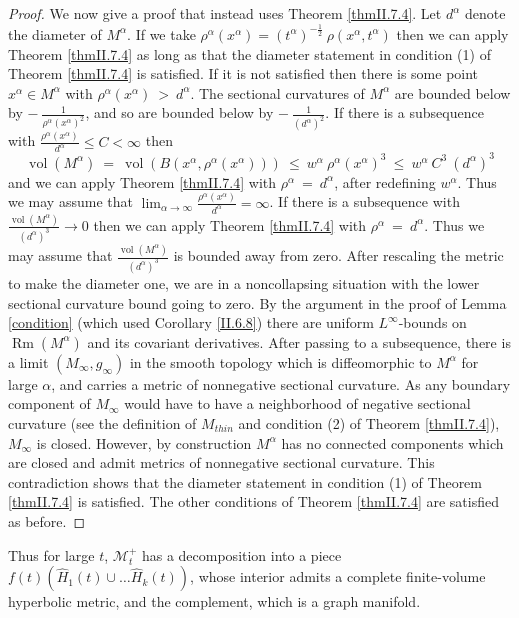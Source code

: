 \documentclass[12pt]{amsart}
\newcommand{\al}{\alpha}
\newcommand{\M}{{\mathcal M}}
\newcommand{\Rm}{\operatorname{Rm}}
\newcommand{\vol}{\operatorname{vol}}
\numberwithin{equation}{section}
\theoremstyle{plain}
\theoremstyle{definition}
\theoremstyle{remark}
\begin{document}
\begin{proof}
We now give a proof that instead uses Theorem \ref{thmII.7.4}.
Let $d^\al$ denote the diameter of $M^\al$.
If we take $\rho^\al(x^\al) = (t^\al)^{- \frac12} \: \rho(x^\al, t^\al)$
then we can apply Theorem \ref{thmII.7.4} as long as
that the diameter statement in condition (1) of Theorem \ref{thmII.7.4} is
satisfied. 
If it is not satisfied then there is some point $x^\al \in M^\al$ with
$\rho^\al(x^\al) \: > \:  d^\al$. 
The sectional curvatures of $M^\al$ are bounded below by 
$- \: \frac{1}{\rho^\al(x^\al)^2}$, and so are bounded below by
$- \: \frac{1}{(d^\al)^2}$.
If there is a subsequence  with
$\frac{\rho^\al(x^\al)}{d^\al} \le C < \infty$  then
\begin{equation}
\vol(M^\al) \: = \: \vol(B(x^\al, \rho^\al(x^\al))) \: \le \: w^\al \:
\rho^\al(x^\al)^3 \: \le \: w^\al \: C^3 \: (d^\al)^3
\end{equation}
and we can apply Theorem \ref{thmII.7.4} with $\rho^\al \: = \: d^\al$,
after redefining $w^\al$.
Thus we may assume that 
$\lim_{\al \rightarrow \infty} \frac{\rho^\al(x^\al)}{d^\al} = \infty$.
If there is a subsequence with
$\frac{\vol(M^\al)}{(d^\al)^3}  \rightarrow 0$ then we
can apply Theorem \ref{thmII.7.4} with $\rho^\al \: = \: d^\al$.
Thus we may assume that $\frac{\vol(M^\al)}{(d^\al)^3}$ is bounded away from zero.
After rescaling the metric to make the diameter one, we are in a
noncollapsing situation 
with the lower sectional curvature bound going to zero.
By the argument in the proof of Lemma \ref{condition} (which used
Corollary \ref{II.6.8}) there are uniform $L^\infty$-bounds on $\Rm(M^\al)$ and
its covariant derivatives.  After passing to a subsequence, there is a
limit $(M_\infty, g_\infty)$ in the smooth topology which is diffeomorphic
to $M^\al$ for large $\al$, and carries a metric of nonnegative sectional curvature. 
As any boundary component of $M_\infty$ would have to have a neighborhood
of negative sectional curvature (see 
the definition of $M_{thin}$ and 
condition (2) of Theorem \ref{thmII.7.4}),
$M_\infty$ is closed. However, by construction $M^\al$ has no connected components
which are closed and admit metrics of nonnegative sectional curvature.
 This contradiction shows that the diameter statement in condition
(1) of Theorem \ref{thmII.7.4} is satisfied. The other conditions of
Theorem \ref{thmII.7.4} are satisfied as before.
\end{proof}

Thus for large $t$,  $\M_t^+$ has a decomposition into
a piece  $f(t) (\widehat{H}_1(t) \cup \ldots \widehat{H}_k(t))$, whose interior admits
a complete finite-volume hyperbolic metric, and the complement, which is a
graph manifold.
\end{document}
